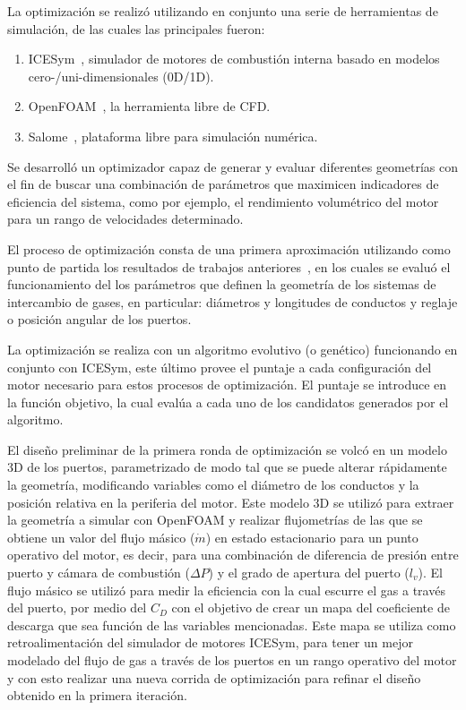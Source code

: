La optimización se realizó utilizando en conjunto una serie de herramientas de
simulación, de las cuales las principales fueron:

\begin{enumerate}
    \item ICESym~\parencite{icesym}, simulador de motores de combustión interna basado en modelos cero-/uni-dimensionales (0D/1D).
    \item OpenFOAM~\parencite{openfoam}, la herramienta libre de CFD.
    \item Salome~\parencite{salome}, plataforma libre para simulación numérica.
\end{enumerate}


Se desarrolló un optimizador capaz de generar y evaluar diferentes geometrías
con el fin de buscar una combinación de parámetros que maximicen indicadores de
eficiencia del sistema, como por ejemplo, el rendimiento volumétrico del motor
para un rango de velocidades determinado.

El proceso de optimización consta de una primera aproximación utilizando como
punto de partida los resultados de trabajos anteriores~\parencite{lopez13}, en
los cuales se evaluó el funcionamiento del los parámetros que definen la
geometría de los sistemas de intercambio de gases, en particular: diámetros y
longitudes de conductos y reglaje o posición angular de los puertos.

La optimización se realiza con un algoritmo evolutivo (o genético) funcionando
en conjunto con ICESym, este último provee el puntaje a cada configuración del
motor necesario para estos procesos de optimización.
%
El puntaje se introduce en la función objetivo, la cual evalúa a cada uno de los
candidatos generados por el algoritmo.

El diseño preliminar de la primera ronda de optimización se volcó en un modelo
3D de los puertos, parametrizado de modo tal que se puede alterar rápidamente la
geometría, modificando variables como el diámetro de los conductos y la posición
relativa en la periferia del motor.
%
Este modelo 3D se utilizó para extraer la geometría a simular con OpenFOAM y
realizar flujometrías de las que se obtiene un valor del flujo másico
($\dot{m}$) en estado estacionario para un punto operativo del motor, es decir,
para una combinación de diferencia de presión entre puerto y cámara de
combustión ($\Delta P$) y el grado de apertura del puerto ($l_{v}$).
%
El flujo másico se utilizó para medir la eficiencia con la cual escurre el gas a
través del puerto, por medio del $C_{D}$ con el objetivo de crear un mapa del
coeficiente de descarga que sea función de las variables mencionadas.
%
Este mapa se utiliza como retroalimentación del simulador de motores ICESym,
para tener un mejor modelado del flujo de gas a través de los puertos en un
rango operativo del motor y con esto realizar una nueva corrida de optimización
para refinar el diseño obtenido en la primera iteración.
%


